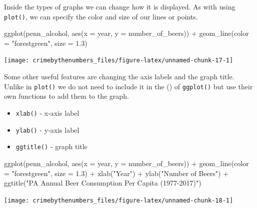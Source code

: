 \documentclass[
]{krantz}
\makeatletter
\newenvironment{Shaded}{\begin{snugshade}}{\end{snugshade}}
\newcommand{\AttributeTok}[1]{\textcolor[rgb]{0.61,0.61,0.61}{#1}}
\newcommand{\FloatTok}[1]{\textcolor[rgb]{0.06,0.06,0.06}{#1}}
\newcommand{\FunctionTok}[1]{\textcolor[rgb]{0,0,0}{#1}}
\newcommand{\NormalTok}[1]{#1}
\newcommand{\SpecialCharTok}[1]{\textcolor[rgb]{0,0,0}{#1}}
\newcommand{\StringTok}[1]{\textcolor[rgb]{0.5,0.5,0.5}{#1}}
\providecommand{\tightlist}{%
  \setlength{\itemsep}{0pt}\setlength{\parskip}{0pt}}
\newenvironment{kframe}{%
\medskip{}
\setlength{\fboxsep}{.8em}
 \def\at@end@of@kframe{}%
 \ifinner\ifhmode%
  \def\at@end@of@kframe{\end{minipage}}%
  \begin{minipage}{\columnwidth}%
 \fi\fi%
 \def\FrameCommand##1{\hskip\@totalleftmargin \hskip-\fboxsep
 \colorbox{shadecolor}{##1}\hskip-\fboxsep
     \hskip-\linewidth \hskip-\@totalleftmargin \hskip\columnwidth}%
 \MakeFramed {\advance\hsize-\width
   \@totalleftmargin\z@ \linewidth\hsize
   \@setminipage}}%
 {\par\unskip\endMakeFramed%
 \at@end@of@kframe}
\renewenvironment{Shaded}{\begin{kframe}}{\end{kframe}}
\makeatother
\begin{document}
Inside the types of graphs we can change how it is displayed. As with using \texttt{plot()}, we can specify the color and size of our lines or points.

\begin{Shaded}
\begin{Highlighting}[]
\FunctionTok{ggplot}\NormalTok{(penn\_alcohol, }\FunctionTok{aes}\NormalTok{(}\AttributeTok{x =}\NormalTok{ year, }\AttributeTok{y =}\NormalTok{ number\_of\_beers)) }\SpecialCharTok{+}
  \FunctionTok{geom\_line}\NormalTok{(}\AttributeTok{color =} \StringTok{"forestgreen"}\NormalTok{, }\AttributeTok{size =} \FloatTok{1.3}\NormalTok{)}
\end{Highlighting}
\end{Shaded}

\begin{center}\texttt{[image: crimebythenumbers\_files/figure-latex/unnamed-chunk-17-1]} \end{center}

Some other useful features are changing the axis labels and the graph title. Unlike in \texttt{plot()} we do not need to include it in the () of \texttt{ggplot()} but use their own functions to add them to the graph.

\begin{itemize}
\tightlist
\item
  \texttt{xlab()} - x-axis label
\item
  \texttt{ylab()} - y-axis label
\item
  \texttt{ggtitle()} - graph title
\end{itemize}

\begin{Shaded}
\begin{Highlighting}[]
\FunctionTok{ggplot}\NormalTok{(penn\_alcohol, }\FunctionTok{aes}\NormalTok{(}\AttributeTok{x =}\NormalTok{ year, }\AttributeTok{y =}\NormalTok{ number\_of\_beers)) }\SpecialCharTok{+}
  \FunctionTok{geom\_line}\NormalTok{(}\AttributeTok{color =} \StringTok{"forestgreen"}\NormalTok{, }\AttributeTok{size =} \FloatTok{1.3}\NormalTok{) }\SpecialCharTok{+} \FunctionTok{xlab}\NormalTok{(}\StringTok{"Year"}\NormalTok{) }\SpecialCharTok{+}
  \FunctionTok{ylab}\NormalTok{(}\StringTok{"Number of Beers"}\NormalTok{) }\SpecialCharTok{+} \FunctionTok{ggtitle}\NormalTok{(}\StringTok{"PA Annual Beer Consumption Per Capita (1977{-}2017)"}\NormalTok{)}
\end{Highlighting}
\end{Shaded}

\begin{center}\texttt{[image: crimebythenumbers\_files/figure-latex/unnamed-chunk-18-1]} \end{center}
\end{document}
